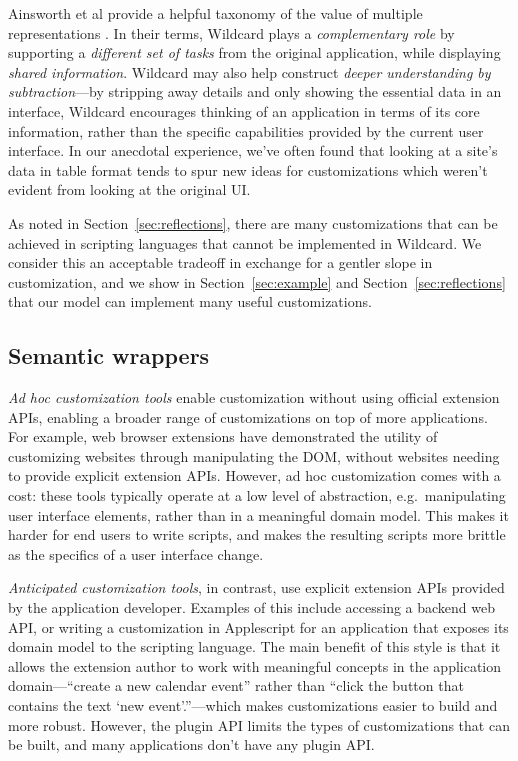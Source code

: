 \documentclass[sigplan,screen,10pt,anonymous,review]{acmart}
\begin{document}
Ainsworth et al provide a helpful taxonomy of the value of multiple
representations \citep{ainsworth1999}. In their terms, Wildcard plays a
\emph{complementary role} by supporting a \emph{different set of tasks}
from the original application, while displaying \emph{shared
information}. Wildcard may also help construct \emph{deeper
understanding by subtraction}---by stripping away details and only
showing the essential data in an interface, Wildcard encourages thinking
of an application in terms of its core information, rather than the
specific capabilities provided by the current user interface. In our
anecdotal experience, we've often found that looking at a site's data in
table format tends to spur new ideas for customizations which weren't
evident from looking at the original UI.

As noted in Section~\ref{sec:reflections}, there are many customizations
that can be achieved in scripting languages that cannot be implemented
in Wildcard. We consider this an acceptable tradeoff in exchange for a
gentler slope in customization, and we show in Section~\ref{sec:example}
and Section~\ref{sec:reflections} that our model can implement many
useful customizations.

\hypertarget{semantic-wrappers}{%
\subsection{Semantic wrappers}\label{semantic-wrappers}}

\emph{Ad hoc customization tools} enable customization without using
official extension APIs, enabling a broader range of customizations on
top of more applications. For example, web browser extensions have
demonstrated the utility of customizing websites through manipulating
the DOM, without websites needing to provide explicit extension APIs.
However, ad hoc customization comes with a cost: these tools typically
operate at a low level of abstraction, e.g.~manipulating user interface
elements, rather than in a meaningful domain model. This makes it harder
for end users to write scripts, and makes the resulting scripts more
brittle as the specifics of a user interface change.

\emph{Anticipated customization tools}, in contrast, use explicit
extension APIs provided by the application developer. Examples of this
include accessing a backend web API, or writing a customization in
Applescript for an application that exposes its domain model to the
scripting language. The main benefit of this style is that it allows the
extension author to work with meaningful concepts in the application
domain---``create a new calendar event'' rather than ``click the button
that contains the text `new event'.''---which makes customizations
easier to build and more robust. However, the plugin API limits the
types of customizations that can be built, and many applications don't
have any plugin API.
\end{document}
